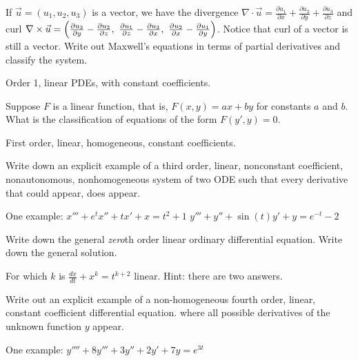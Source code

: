 \begin{exercise}
If $\vec{u} = (u_1,u_2,u_3)$ is a vector, we have the divergence
$\nabla \cdot \vec{u} =
\frac{\partial u_1}{\partial x} +
\frac{\partial u_2}{\partial y} +
\frac{\partial u_3}{\partial z}$ and curl
$\nabla \times \vec{u} =
\Bigl(
\frac{\partial u_3}{\partial y} - \frac{\partial u_2}{\partial z} , ~
\frac{\partial u_1}{\partial z} - \frac{\partial u_3}{\partial x} , ~
\frac{\partial u_2}{\partial x} - \frac{\partial u_1}{\partial y} \Bigr)$.
Notice that curl of a vector is still a vector.  Write out Maxwell's
equations in terms of partial derivatives and classify the system.
\end{exercise}
\comboSol{%
}
{%
Order 1, linear PDEs, with constant coefficients.
}

\begin{exercise}
Suppose $F$ is a linear function, that is,
$F(x,y) = ax+by$ for constants $a$ and $b$.  What is the
classification of equations of the form $F(y',y) = 0$.
\end{exercise}
\comboSol{%
}
{%
First order, linear, homogeneous, constant coefficients.
}

\begin{exercise}
Write down an explicit example of a third order, linear, nonconstant coefficient,
nonautonomous, nonhomogeneous system of two ODE such that every derivative
that could appear, does appear.
\end{exercise}
\comboSol{%
}
{%
One example:
$x''' + e^t x'' + tx' + x = t^2 + 1$ \quad 
$y''' + y'' + \sin(t)y' + y = e^{-t} - 2$
}

\begin{exercise}\ansMark%
Write down the general \emph{zero}th order linear ordinary differential
equation.  Write down the general solution.
\end{exercise}

\begin{exercise}\ansMark%
For which $k$ is $\frac{dx}{dt}+x^k = t^{k+2}$ linear.  Hint: there are two answers.
\end{exercise}

\begin{exercise}
Write out an explicit example of a non-homogeneous fourth order, linear, constant coefficient differential equation. where all possible derivatives of the unknown function $y$ appear. 
\end{exercise}
\comboSol{%
}
{%
One example: $y'''' + 8y''' + 3y'' + 2y' + 7y = e^{3t}$
}

